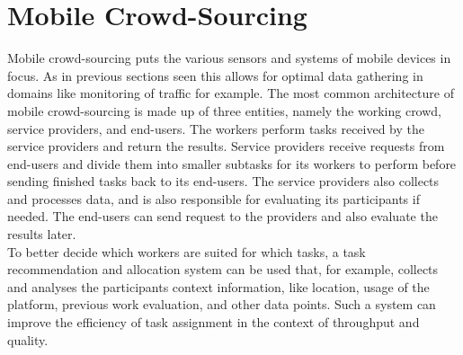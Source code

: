 \documentclass[a4paper,12pt]{report}
\begin{document}
	\section[Mobile Crowd-Sourcing]{Mobile Crowd-Sourcing \cite{MobileCrowdSourcing}}
	\startsection
		Mobile crowd-sourcing puts the various sensors and systems of mobile devices in focus. As in previous sections seen this allows for optimal data gathering in domains like monitoring of traffic for example.
		The most common architecture of mobile crowd-sourcing is made up of three entities, namely the working crowd, service providers, and end-users. The workers perform tasks received by the service providers and return the results. Service providers receive requests from end-users and divide them into smaller subtasks for its workers to perform before sending finished tasks back to its end-users. The service providers also collects and processes data, and is also responsible for evaluating its participants if needed. The end-users can send request to the providers and also evaluate the results later.\\
		To better decide which workers are suited for which tasks, a task recommendation and allocation system can be used that, for example, collects and analyses the participants context information, like location, usage of the platform, previous work evaluation, and other data points. Such a system can improve the efficiency of task assignment in the context of throughput and quality.
\end{document}
